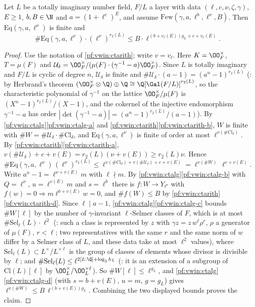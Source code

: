 \begin{proposition}\label{pf:vwin:scount}
Let $L$ be a totally imaginary number field, $F/L$ a layer with data $(\ell,c,\nu,\zeta,\gamma)$, $E\ge1$, $b,B\in\N$ and
$a=(1+\ell^c)^E$, and assume $\mathrm{Few}(\gamma,a,\ell^b,\ell^\nu,B)$. Then $\mathrm{Eq}(\gamma,a,\ell^\nu)$ is finite and
\[
 \#\mathrm{Eq}(\gamma,a,\ell^\nu)\cdot(\ell^\nu)^{r_2(L)}\le B\cdot\ell^{(b+v_\ell(E))g_L+c+v_\ell(E)}.
\]
\end{proposition}

\begin{proof}
Use the notation of \cref{pf:vwin:ctarith}; write $v=v_\ell$. Here $K=\OO_F^\times$, $T=\mu(F)$ and $\mathcal U_\delta=\OO_F^\times/(\mu(F)\cdot
(\gamma^{-1}-a)\OO_F^\times)$. Since $L$ is totally imaginary and $F/L$ is cyclic of degree $n$, $\mathcal U_\delta$ is finite and
$\#\mathcal U_\delta\cdot(a-1)=(a^n-1)^{r_2(L)}$ (: by Herbrand's theorem
$(\OO_F^\times\otimes\Q)\oplus\Q\cong\Q[\Gal(F/L)]^{r_2(L)}$, so the characteristic polynomial of $\gamma^{-1}$ on the lattice
$\OO_F^\times/\mu(F)$ is $(X^n-1)^{r_2(L)}/(X-1)$, and the cokernel of the injective endomorphism $\gamma^{-1}-a$ has order
$|\det(\gamma^{-1}-a)|=(a^n-1)^{r_2(L)}/(a-1)$). By \cref{pf:vwin:ctalg}\ref{pf:vwin:ctalg-a} and \cref{pf:vwin:ctarith}\ref{pf:vwin:ctarith-b},
$W$ is finite with $\#W=\#\mathcal U_\delta\cdot\#\mathrm{Cl}_\delta$, and $\mathrm{Eq}(\gamma,a,\ell^\nu)$ is finite of order at most $\ell^{v(\#\mathrm{Cl}_\delta)}$.
By \cref{pf:vwin:ctarith}\ref{pf:vwin:ctarith-a}, $v(\#\mathcal U_\delta)+c+v(E)=r_2(L)(\nu+v(E))\ge r_2(L)\nu$. Hence
\[
 \#\mathrm{Eq}(\gamma,a,\ell^\nu)\,(\ell^\nu)^{r_2(L)}\le\ell^{v(\#\mathrm{Cl}_\delta)+v(\#\mathcal U_\delta)+c+v(E)}=\ell^{v(\#W)}\,\ell^{c+v(E)}.
\]
Write $a^n-1=\ell^{\nu+v(E)}m$ with $\ell\nmid m$. By \cref{pf:vwin:ctalg}\ref{pf:vwin:ctalg-b} with $Q=\ell^\nu$, $u=\ell^{v(E)}m$ and
$s=\ell^b$ there is $f:W\to Y_{\ell^\nu}$ with $f(w)=0\Rightarrow m\ell^{b+v(E)}w=0$, and $\#f(W)\le B$ by
\cref{pf:vwin:ctarith}\ref{pf:vwin:ctarith-d}. Since $\ell\mid a-1$, \cref{pf:vwin:ctalg}\ref{pf:vwin:ctalg-c} bounds $\#W[\ell]$ by the
number of $\gamma$-invariant $\ell$-Selmer classes of $F$, which is at most $\#\mathrm{Sel}_\ell(L)\cdot\ell^2$
(: such a class is represented by $z$ with $\gamma z=z\,w^\ell\rho^r$, $\rho$ a generator of
$\mu(F)$, $r<\ell$; two representatives with the same $r$ and the same norm of $w$ differ by a Selmer class of $L$, and these data take
at most $\ell^2$ values), where $\mathrm{Sel}_\ell(L)\subset L^\times/L^{\times\ell}$ is the group of classes of elements whose divisor
is divisible by $\ell$; and $\#\mathrm{Sel}_\ell(L)\le\ell^{2[L:\Q]+\log_2h_L}$ (: it is an
extension of a subgroup of $\mathrm{Cl}(L)[\ell]$ by $\OO_L^\times/\OO_L^{\times\ell}$). So $\#W[\ell]\le\ell^{g_L}$, and
\cref{pf:vwin:ctalg}\ref{pf:vwin:ctalg-d} (with $s=b+v(E)$, $u=m$, $g=g_L$) gives $\ell^{v(\#W)}\le B\,\ell^{(b+v(E))g_L}$.
Combining the two displayed bounds proves the claim.
\end{proof}


